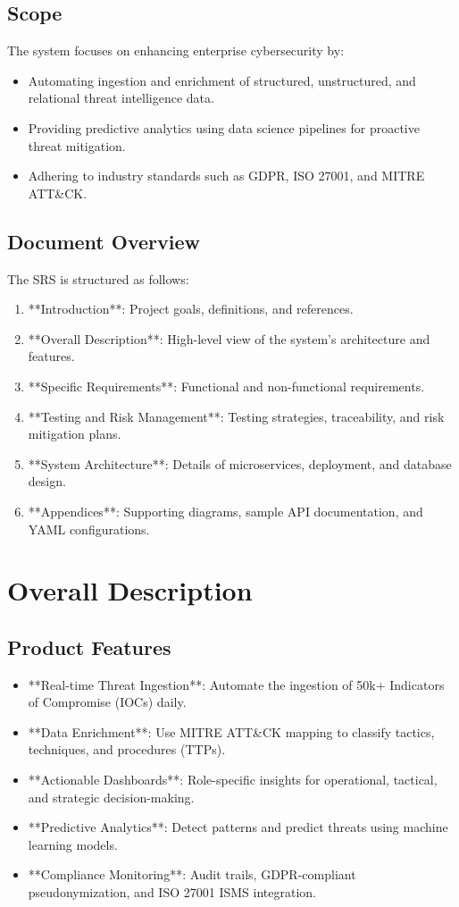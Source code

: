 \documentclass[12pt]{article}
\begin{document}
\subsection{Scope}
The system focuses on enhancing enterprise cybersecurity by:
\begin{itemize}
    \item Automating ingestion and enrichment of structured, unstructured, and relational threat intelligence data.
    \item Providing predictive analytics using data science pipelines for proactive threat mitigation.
    \item Adhering to industry standards such as GDPR, ISO 27001, and MITRE ATT&CK.
\end{itemize}

\subsection{Document Overview}
The SRS is structured as follows:
\begin{enumerate}
    \item **Introduction**: Project goals, definitions, and references.
    \item **Overall Description**: High-level view of the system’s architecture and features.
    \item **Specific Requirements**: Functional and non-functional requirements.
    \item **Testing and Risk Management**: Testing strategies, traceability, and risk mitigation plans.
    \item **System Architecture**: Details of microservices, deployment, and database design.
    \item **Appendices**: Supporting diagrams, sample API documentation, and YAML configurations.
\end{enumerate}

\newpage

\section{Overall Description}
\subsection{Product Features}
\begin{itemize}
    \item **Real-time Threat Ingestion**: Automate the ingestion of 50k+ Indicators of Compromise (IOCs) daily.
    \item **Data Enrichment**: Use MITRE ATT&CK mapping to classify tactics, techniques, and procedures (TTPs).
    \item **Actionable Dashboards**: Role-specific insights for operational, tactical, and strategic decision-making.
    \item **Predictive Analytics**: Detect patterns and predict threats using machine learning models.
    \item **Compliance Monitoring**: Audit trails, GDPR-compliant pseudonymization, and ISO 27001 ISMS integration.
\end{itemize}
\end{document}

